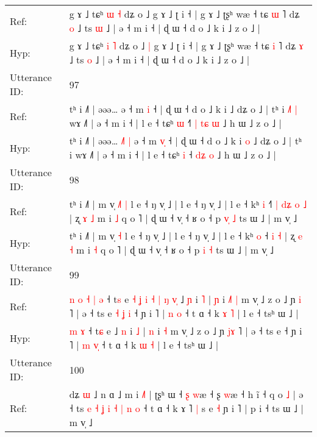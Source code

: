 \documentclass[10pt]{article}
\DeclareRobustCommand{\hl}[1]{{\textcolor{red}{#1}}}
\begin{document}
\begin{longtable}{ll}
Ref: & g ɤ ˩ tɕʰ \hl{ɯ} \hl{˧} dʑ o ˩\hl{}\hl{} g ɤ ˩ ʈ i ˧ | g ɤ ˩ ʈʂʰ wæ ˧ tɕ \hl{ɯ} ˥ dʑ \hl{o} ˩ ts \hl{ɯ} ˩ | ə ˧ m i ˧ | ɖ ɯ ˧ d o ˩ k i ˩ z o ˩ |
 \\
Hyp: & g ɤ ˩ tɕʰ \hl{i} \hl{˥} dʑ o ˩\hl{ }\hl{|} g ɤ ˩ ʈ i ˧ | g ɤ ˩ ʈʂʰ wæ ˧ tɕ \hl{i} ˥ dʑ \hl{ɤ} ˩ ts \hl{o} ˩ | ə ˧ m i ˧ | ɖ ɯ ˧ d o ˩ k i ˩ z o ˩ |
 \\
\midrule
Utterance ID: & 97 \\
Ref: & tʰ i ˩˥ | əəə…\hl{}\hl{}\hl{}\hl{}\hl{} ə ˧ m \hl{}\hl{i} ˧ | ɖ ɯ ˧ d o ˩ k i\hl{}\hl{} ˩ dʑ o ˩ | tʰ i\hl{ }\hl{˩}\hl{˥}\hl{ }\hl{|} wɤ ˩˥ | ə ˧ m i ˧ | l e ˧ tɕʰ \hl{ɯ} ˧\hl{˥}\hl{ }\hl{|} \hl{t}\hl{ɕ} \hl{ɯ} ˩ h ɯ ˩ z o ˩ |
 \\
Hyp: & tʰ i ˩˥ | əəə…\hl{ }\hl{˩}\hl{˥}\hl{ }\hl{|} ə ˧ m \hl{v}\hl{̩} ˧ | ɖ ɯ ˧ d o ˩ k i\hl{ }\hl{o} ˩ dʑ o ˩ | tʰ i\hl{}\hl{}\hl{}\hl{}\hl{} wɤ ˩˥ | ə ˧ m i ˧ | l e ˧ tɕʰ \hl{i} ˧\hl{}\hl{}\hl{} \hl{d}\hl{ʑ} \hl{o} ˩ h ɯ ˩ z o ˩ |
 \\
\midrule
Utterance ID: & 98 \\
Ref: & tʰ i ˩˥ | m v̩\hl{ }\hl{˩}\hl{˥} \hl{|} l e ˧ ŋ v̩ ˩ | l e ˧ ŋ v̩ ˩ | l e ˧ kʰ \hl{i} ˧\hl{˥}\hl{ }\hl{|}\hl{ }\hl{d}\hl{ʑ} \hl{o} \hl{˩} | ʐ \hl{ɤ} \hl{˩} m i \hl{˩} q o ˥ | ɖ ɯ ˧ v̩ ˧ ʁ o ˧ p \hl{v}\hl{̩} \hl{˩} ts ɯ ˩ | m v̩ ˩
 \\
Hyp: & tʰ i ˩˥ | m v̩\hl{}\hl{}\hl{} \hl{˧} l e ˧ ŋ v̩ ˩ | l e ˧ ŋ v̩ ˩ | l e ˧ kʰ \hl{o} ˧\hl{}\hl{}\hl{}\hl{}\hl{}\hl{} \hl{i} \hl{˧} | ʐ \hl{e} \hl{˧} m i \hl{˧} q o ˥ | ɖ ɯ ˧ v̩ ˧ ʁ o ˧ p \hl{}\hl{i} \hl{˧} ts ɯ ˩ | m v̩ ˩
 \\
\midrule
Utterance ID: & 99 \\
Ref: & \hl{n}\hl{ }\hl{o}\hl{ }\hl{˧}\hl{ }\hl{|} \hl{ə} ˧ t\hl{s} e\hl{ }\hl{˧}\hl{ }\hl{ʝ}\hl{ }\hl{i}\hl{ }\hl{˧}\hl{ }\hl{|}\hl{ }\hl{ŋ}\hl{ }\hl{v}\hl{̩} ˩ \hl{ɲ} i \hl{˥} | \hl{ɲ} i\hl{ }\hl{˩}\hl{˥} \hl{|} m v̩ ˩ z o ˩ ɲ \hl{}\hl{i} ˥ | ə ˧ ts e\hl{ }\hl{˧}\hl{ }\hl{ʝ}\hl{ }\hl{i} ˧ ɲ i ˥ | \hl{n} \hl{}\hl{o} ˧ t ɑ ˧ k \hl{ɤ} \hl{˥} | l e ˧ tsʰ ɯ ˩ |
 \\
Hyp: & \hl{}\hl{}\hl{}\hl{}\hl{}\hl{}\hl{m} \hl{ɤ} ˧ t\hl{ɕ} e\hl{}\hl{}\hl{}\hl{}\hl{}\hl{}\hl{}\hl{}\hl{}\hl{}\hl{}\hl{}\hl{}\hl{}\hl{} ˩ \hl{n} i \hl{˩} | \hl{n} i\hl{}\hl{}\hl{} \hl{˧} m v̩ ˩ z o ˩ ɲ \hl{j}\hl{ɤ} ˥ | ə ˧ ts e\hl{}\hl{}\hl{}\hl{}\hl{}\hl{} ˧ ɲ i ˥ | \hl{m} \hl{v}\hl{̩} ˧ t ɑ ˧ k \hl{ɯ} \hl{˧} | l e ˧ tsʰ ɯ ˩ |
 \\
\midrule
Utterance ID: & 100 \\
Ref: & dʑ \hl{ɯ} ˩ n ɑ ˩ m i \hl{˩}˥ | ʈʂʰ ɯ ˧\hl{ }\hl{ʂ} \hl{w}æ ˧ ʂ \hl{w}æ ˧ h ĩ ˧ q o \hl{˩} | ə ˧ ts\hl{ }\hl{e}\hl{ }\hl{˧} \hl{ʝ} \hl{i} \hl{˧} \hl{|} \hl{n}\hl{ }\hl{o} ˧ t ɑ ˧ k ɤ ˥\hl{ }\hl{|} s e \hl{˧} ɲ i ˥ | p i ˧ ts ɯ ˩ | m v̩ ˩

\end{longtable}
\end{document}
